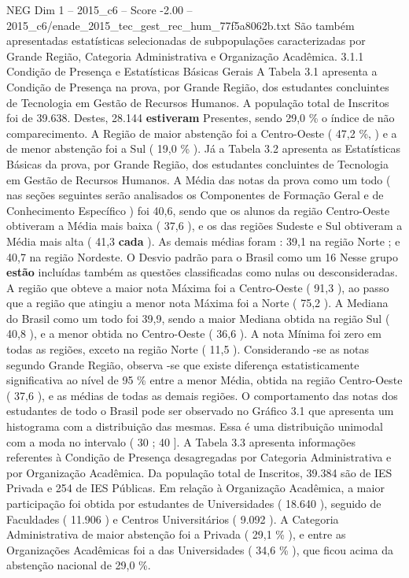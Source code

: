 \begin{textsample}{NEG Dim 1 – 2015\_c6 – Score -2.00 – 2015\_c6/enade\_2015\_tec\_gest\_rec\_hum\_77f5a8062b.txt}
São também apresentadas estatísticas selecionadas de subpopulações caracterizadas por Grande Região, Categoria Administrativa e Organização Acadêmica. 3.1.1 Condição de Presença e Estatísticas Básicas Gerais A Tabela 3.1 apresenta a Condição de Presença na prova, por Grande Região, dos estudantes concluintes de Tecnologia em Gestão de Recursos Humanos.
A população total de Inscritos foi de 39.638.
Destes, 28.144 \textbf{estiveram} Presentes, sendo 29,0 \% o índice de não comparecimento.
A Região de maior abstenção foi a Centro-Oeste ( 47,2 \%, ) e a de menor abstenção foi a Sul ( 19,0 \% ).
Já a Tabela 3.2 apresenta as Estatísticas Básicas da prova, por Grande Região, dos estudantes concluintes de Tecnologia em Gestão de Recursos Humanos.
A Média das notas da prova como um todo ( nas seções seguintes serão analisados os Componentes de Formação Geral e de Conhecimento Específico ) foi 40,6, sendo que os alunos da região Centro-Oeste obtiveram a Média mais baixa ( 37,6 ), e os das regiões Sudeste e Sul obtiveram a Média mais alta ( 41,3 \textbf{cada} ).
As demais médias foram : 39,1 na região Norte ; e 40,7 na região Nordeste.
O Desvio padrão para o Brasil como um 16 Nesse grupo \textbf{estão} incluídas também as questões classificadas como nulas ou desconsideradas.
A região que obteve a maior nota Máxima foi a Centro-Oeste ( 91,3 ), ao passo que a região que atingiu a menor nota Máxima foi a Norte ( 75,2 ).
A Mediana do Brasil como um todo foi 39,9, sendo a maior Mediana obtida na região Sul ( 40,8 ), e a menor obtida no Centro-Oeste ( 36,6 ).
A nota Mínima foi zero em todas as regiões, exceto na região Norte ( 11,5 ).
Considerando -se as notas segundo Grande Região, observa -se que existe diferença estatisticamente significativa ao nível de 95 \% entre a menor Média, obtida na região Centro-Oeste ( 37,6 ), e as médias de todas as demais regiões.
O comportamento das notas dos estudantes de todo o Brasil pode ser observado no Gráfico 3.1 que apresenta um histograma com a distribuição das mesmas.
Essa é uma distribuição unimodal com a moda no intervalo ( 30 ; 40 ].
A Tabela 3.3 apresenta informações referentes à Condição de Presença desagregadas por Categoria Administrativa e por Organização Acadêmica.
Da população total de Inscritos, 39.384 são de IES Privada e 254 de IES Públicas.
Em relação à Organização Acadêmica, a maior participação foi obtida por estudantes de Universidades ( 18.640 ), seguido de Faculdades ( 11.906 ) e Centros Universitários ( 9.092 ).
A Categoria Administrativa de maior abstenção foi a Privada ( 29,1 \% ), e entre as Organizações Acadêmicas foi a das Universidades ( 34,6 \% ), que ficou acima da abstenção nacional de 29,0 \%.

\end{textsample}
